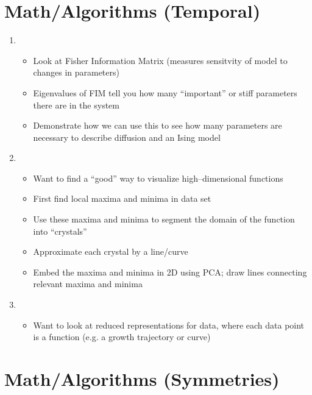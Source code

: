 \documentclass[12pt]{article}
\begin{document}
\section{Math/Algorithms (Temporal)}

\begin{enumerate}

\item {}
\begin{itemize}
	\item Look at Fisher Information Matrix (measures sensitvity of model to changes in parameters)
	\item Eigenvalues of FIM tell you how many ``important'' or stiff parameters there are in the system
	\item Demonstrate how we can use this to see how many parameters are necessary to describe diffusion and an Ising model
\end{itemize}

\item {}
\begin{itemize}
	\item Want to find a ``good'' way to visualize high--dimensional functions
	\item First find local maxima and minima in data set
	\item Use these maxima and minima to segment the domain of the function into ``crystals''
	\item Approximate each crystal by a line/curve
	\item Embed the maxima and minima in 2D using PCA; draw lines connecting relevant maxima and minima
\end{itemize}

\item {}
\begin{itemize}
	\item Want to look at reduced representations for data, where each data point is a function (e.g. a growth trajectory or curve)
\end{itemize}

\end{enumerate}

\section{Math/Algorithms (Symmetries)}
\end{document}
